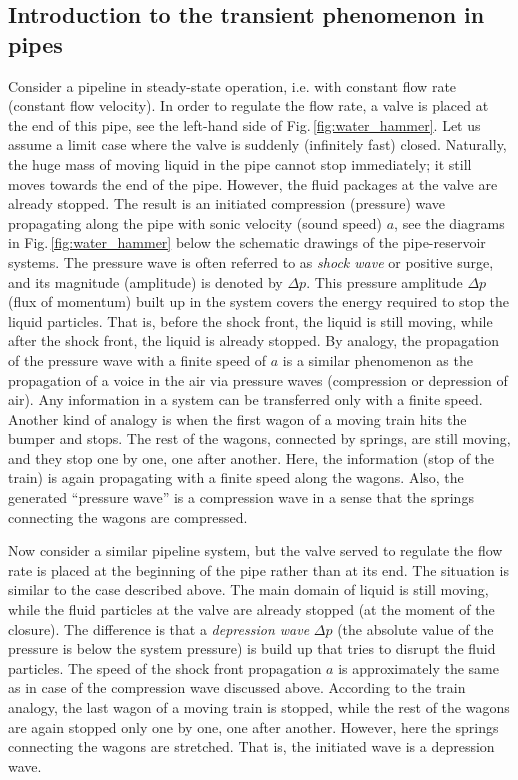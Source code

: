 \subsection{Introduction to the transient phenomenon in pipes} \label{sec:introduction_to_transient_phenomenon}
Consider a pipeline in steady-state operation, i.e. with constant flow rate (constant flow velocity). In order to regulate the flow rate, a valve is placed at the end of this pipe, see the left-hand side of Fig.\,\ref{fig:water_hammer}. Let us assume a limit case where the valve is suddenly (infinitely fast) closed. Naturally, the huge mass of moving liquid in the pipe cannot stop immediately; it still moves towards the end of the pipe. However, the fluid packages at the valve are already stopped. The result is an initiated compression (pressure) wave propagating along the pipe with sonic velocity (sound speed) $a$, see the diagrams in Fig.\,\ref{fig:water_hammer} below the schematic drawings of the pipe-reservoir systems. The pressure wave is often referred to as \emph{shock wave} or positive surge, and its magnitude (amplitude) is denoted by $\Delta p$. This pressure amplitude $\Delta p$ (flux of momentum) built up in the system covers the energy required to stop the liquid particles. That is, before the shock front, the liquid is still moving, while after the shock front, the liquid is already stopped. By analogy, the propagation of the pressure wave with a finite speed of $a$ is a similar phenomenon as the propagation of a voice in the air via pressure waves (compression or depression of air). Any information in a system can be transferred only with a finite speed. Another kind of analogy is when the first wagon of a moving train hits the bumper and stops. The rest of the wagons, connected by springs, are still moving, and they stop one by one, one after another. Here, the information (stop of the train) is again propagating with a finite speed along the wagons. Also, the generated ``pressure wave'' is a compression wave in a sense that the springs connecting the wagons are compressed.

Now consider a similar pipeline system, but the valve served to regulate the flow rate is placed at the beginning of the pipe rather than at its end. The situation is similar to the case described above. The main domain of liquid is still moving, while the fluid particles at the valve are already stopped (at the moment of the closure). The difference is that a \emph{depression wave} $\Delta p$ (the absolute value of the pressure is below the system pressure) is build up that tries to disrupt the fluid particles. The speed of the shock front propagation $a$ is approximately the same as in case of the compression wave discussed above. According to the train analogy, the last wagon of a moving train is stopped, while the rest of the wagons are again stopped only one by one, one after another. However, here the springs connecting the wagons are stretched. That is, the initiated wave is a depression wave.

